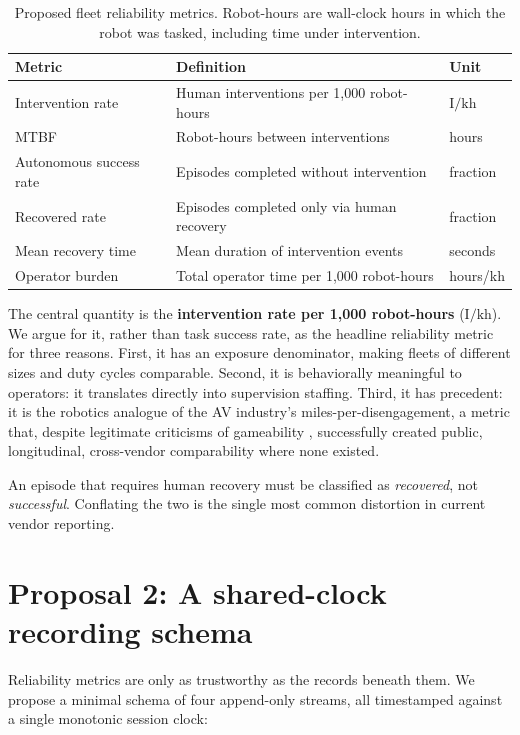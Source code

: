 \documentclass[11pt]{article}
\begin{document}
\begin{table}[h]
\centering
\small
\begin{tabular}{@{}lll@{}}
\toprule
\textbf{Metric} & \textbf{Definition} & \textbf{Unit} \\
\midrule
Intervention rate & Human interventions per 1,000 robot-hours & $\mathrm{I/kh}$ \\
MTBF & Robot-hours between interventions & hours \\
Autonomous success rate & Episodes completed without intervention & fraction \\
Recovered rate & Episodes completed only via human recovery & fraction \\
Mean recovery time & Mean duration of intervention events & seconds \\
Operator burden & Total operator time per 1,000 robot-hours & hours/kh \\
\bottomrule
\end{tabular}
\caption{Proposed fleet reliability metrics. Robot-hours are wall-clock
hours in which the robot was tasked, including time under intervention.}
\label{tab:metrics}
\end{table}

The central quantity is the \textbf{intervention rate per 1,000
robot-hours} ($\mathrm{I/kh}$). We argue for it, rather than task success
rate, as the headline reliability metric for three reasons. First, it has
an exposure denominator, making fleets of different sizes and duty cycles
comparable. Second, it is behaviorally meaningful to operators: it
translates directly into supervision staffing. Third, it has precedent:
it is the robotics analogue of the AV industry's miles-per-disengagement,
a metric that, despite legitimate criticisms of gameability
\citep{dmv2024disengagement}, successfully created public, longitudinal,
cross-vendor comparability where none existed.

An episode that requires human recovery must be classified as
\emph{recovered}, not \emph{successful}. Conflating the two is the single
most common distortion in current vendor reporting.

\section{Proposal 2: A shared-clock recording schema}
\label{sec:schema}

Reliability metrics are only as trustworthy as the records beneath them. We
propose a minimal schema of four append-only streams, all timestamped
against a single monotonic session clock:
\end{document}
